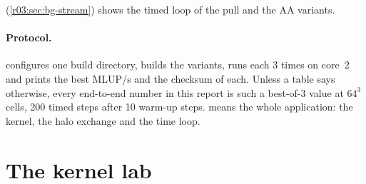  (\cref{r03:sec:bg-stream}) shows the timed loop of the pull and the
AA variants.

\paragraph{Protocol.}  configures one
build directory, builds the variants, runs each 3 times on core~2 and prints the best MLUP/s
and the checksum of each. Unless a table says otherwise, every end-to-end number in this
report is such a best-of-3 value at $64^3$ cells, 200 timed steps after 10 warm-up steps.
 means the whole application: the kernel, the halo exchange and the time
loop.

\section{The kernel lab}\label{r03:sec:lab}

